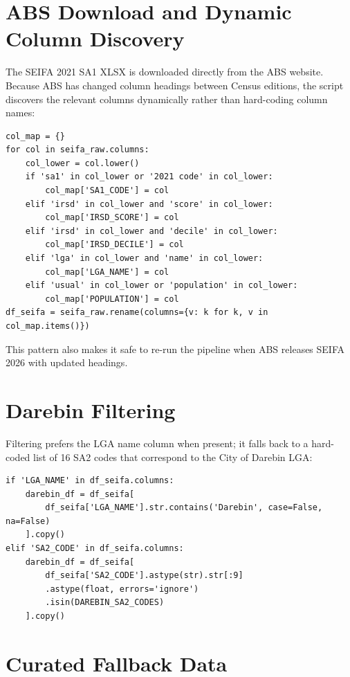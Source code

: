 \documentclass[11pt,a4paper,openany]{book}
\begin{document}
\section{ABS Download and Dynamic Column Discovery}

The SEIFA 2021 SA1 XLSX is downloaded directly from the ABS website.  Because ABS has
changed column headings between Census editions, the script discovers the relevant
columns dynamically rather than hard-coding column names:

\begin{lstlisting}[style=python, caption={Schema-agnostic column discovery in seifa\_analysis.py.}]
col_map = {}
for col in seifa_raw.columns:
    col_lower = col.lower()
    if 'sa1' in col_lower or '2021 code' in col_lower:
        col_map['SA1_CODE'] = col
    elif 'irsd' in col_lower and 'score' in col_lower:
        col_map['IRSD_SCORE'] = col
    elif 'irsd' in col_lower and 'decile' in col_lower:
        col_map['IRSD_DECILE'] = col
    elif 'lga' in col_lower and 'name' in col_lower:
        col_map['LGA_NAME'] = col
    elif 'usual' in col_lower or 'population' in col_lower:
        col_map['POPULATION'] = col
df_seifa = seifa_raw.rename(columns={v: k for k, v in col_map.items()})
\end{lstlisting}

This pattern also makes it safe to re-run the pipeline when ABS releases SEIFA 2026 with
updated headings.

\section{Darebin Filtering}

Filtering prefers the LGA name column when present; it falls back to a hard-coded list of
16 SA2 codes that correspond to the City of Darebin LGA:

\begin{lstlisting}[style=python, caption={LGA-name vs SA2-code fallback filter.}]
if 'LGA_NAME' in df_seifa.columns:
    darebin_df = df_seifa[
        df_seifa['LGA_NAME'].str.contains('Darebin', case=False, na=False)
    ].copy()
elif 'SA2_CODE' in df_seifa.columns:
    darebin_df = df_seifa[
        df_seifa['SA2_CODE'].astype(str).str[:9]
        .astype(float, errors='ignore')
        .isin(DAREBIN_SA2_CODES)
    ].copy()
\end{lstlisting}

\section{Curated Fallback Data}
\end{document}
